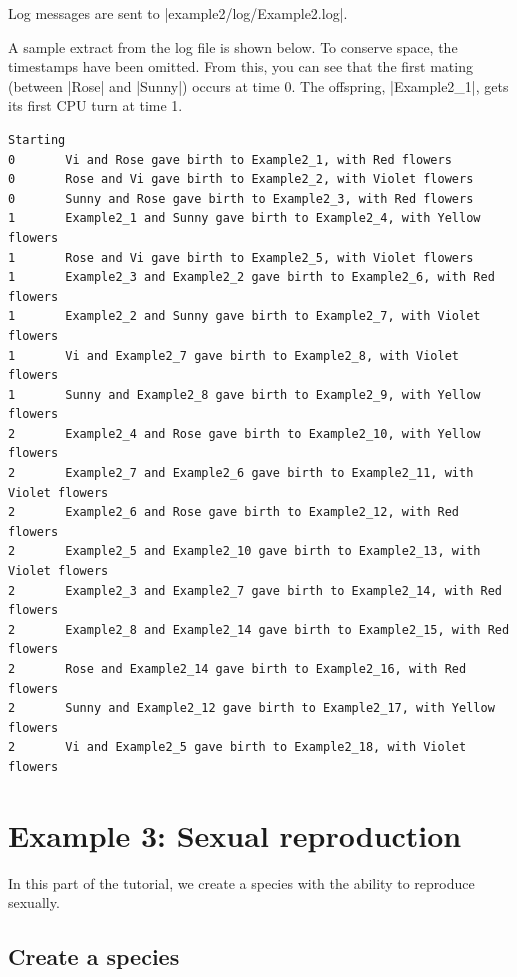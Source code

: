\documentclass[a4paper,10pt]{report}
\begin{document}
Log messages are sent to |example2/log/Example2.log|.

A sample extract from the log file is shown below.
To conserve space, the timestamps have been omitted.
From this, you can see that the first mating (between |Rose| and |Sunny|)
occurs at time 0.
The offspring, |Example2_1|, gets its first CPU turn at time 1.

\begin{verbatim}
Starting
0       Vi and Rose gave birth to Example2_1, with Red flowers
0       Rose and Vi gave birth to Example2_2, with Violet flowers
0       Sunny and Rose gave birth to Example2_3, with Red flowers
1       Example2_1 and Sunny gave birth to Example2_4, with Yellow flowers
1       Rose and Vi gave birth to Example2_5, with Violet flowers
1       Example2_3 and Example2_2 gave birth to Example2_6, with Red flowers
1       Example2_2 and Sunny gave birth to Example2_7, with Violet flowers
1       Vi and Example2_7 gave birth to Example2_8, with Violet flowers
1       Sunny and Example2_8 gave birth to Example2_9, with Yellow flowers
2       Example2_4 and Rose gave birth to Example2_10, with Yellow flowers
2       Example2_7 and Example2_6 gave birth to Example2_11, with Violet flowers
2       Example2_6 and Rose gave birth to Example2_12, with Red flowers
2       Example2_5 and Example2_10 gave birth to Example2_13, with Violet flowers
2       Example2_3 and Example2_7 gave birth to Example2_14, with Red flowers
2       Example2_8 and Example2_14 gave birth to Example2_15, with Red flowers
2       Rose and Example2_14 gave birth to Example2_16, with Red flowers
2       Sunny and Example2_12 gave birth to Example2_17, with Yellow flowers
2       Vi and Example2_5 gave birth to Example2_18, with Violet flowers
\end{verbatim}

\section{Example 3: Sexual reproduction}
\label{sec:bug}

In this part of the tutorial, we create a species with the
ability to reproduce sexually.

\subsection{Create a species}
\label{sec:species3}


\end{document}
